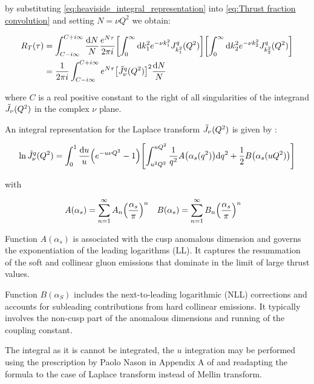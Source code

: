 \documentclass[../main.tex]{subfiles}
\begin{document}
by substituting \cref{eq:heaviside_integral_representation} into \cref{eq:Thrust fraction convolution} and setting $N= \nu Q^2$ we obtain:

\begin{align}
    \begin{split} \label{eq:Thrust fraction}
    R_T(\tau) &= \int_{C - i \infty}^{C + i\infty} \frac{\dd N}{N} \frac{e^{N \tau}}{2\pi i} \qty[\int_0^\infty \dd k_1^2 e^{-\nu k_1^2} J^q_{k_1^2}(Q^2) ] \qty[\int_0^\infty \dd k_2^2 e^{-\nu k_2^2} J^q_{k_2^2}(Q^2)]\\
    &=\frac{1}{2\pi i}\int_{C - i \infty}^{C + i\infty} e^{N \tau} \qty[\Tilde{J}_\nu^q(Q^2)]^2 \frac{\dd N}{N}
    \end{split}
\end{align}

where $C$ is a real positive constant to the right of all singularities of the integrand $\Tilde{J}_\nu(Q^2)$ in the complex $\nu$ plane. 

An integral representation for the Laplace transform $\Tilde{J}_\nu(Q^2)$ is given by \cite{CATANI19933}:

\begin{equation}
    \ln \Tilde{J}_\nu^q(Q^2) = \int_0^1 \frac{\dd u}{u} \qty(e^{-u \nu Q^2}-1)\qty[ \int_{u^2 Q^2}^{u Q^2} \frac{1}{q^2} A\qty(\alpha_s(q^2)) \dd q^2 + \frac{1}{2} B\qty(\alpha_s(u Q^2))]
\end{equation}

with 

\begin{align*}
    A(\alpha_s) &= \sum_{n=1}^\infty A_n \qty(\frac{\alpha_s}{\pi})^n & B(\alpha_s) &= \sum_{n=1}^\infty B_n\qty(\frac{\alpha_s}{\pi})^n
\end{align*}

Function $A(\alpha_s)$ is associated with the cusp anomalous dimension and governs the exponentiation of the leading logarithms (LL). 
It captures the resummation of the soft and collinear gluon emissions that dominate in the limit of large thrust values.

Function $B(\alpha_S)$ includes the next-to-leading logarithmic (NLL) corrections and accounts for subleading contributions from hard collinear emissions.
It typically involves the non-cusp part of the anomalous dimensions and running of the coupling constant.

The integral as it is cannot be integrated, the $u$ integration may be performed using the prescription by Paolo Nason in Appendix A of \cite{Catani_2003_appendix} and
readapting the formula to the case of Laplace transform instead of Mellin transform.
\end{document}

